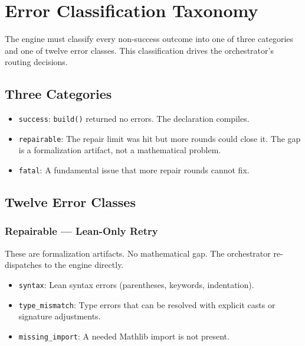 \documentclass[11pt,a4paper]{article}
\begin{document}
\section{Error Classification Taxonomy}
\label{sec:errors}

The engine must classify every non-success outcome into one of three categories and one of twelve error classes. This classification drives the orchestrator's routing decisions.

\subsection{Three Categories}

\begin{itemize}[leftmargin=2em]
  \item \texttt{success}: \texttt{build()} returned no errors. The declaration compiles.
  \item \texttt{repairable}: The repair limit was hit but more rounds could close it. The gap is a formalization artifact, not a mathematical problem.
  \item \texttt{fatal}: A fundamental issue that more repair rounds cannot fix.
\end{itemize}

\subsection{Twelve Error Classes}

\subsubsection{Repairable --- Lean-Only Retry}

These are formalization artifacts. No mathematical gap. The orchestrator re-dispatches to the engine directly.

\begin{itemize}[leftmargin=2em]
  \item \texttt{syntax}: Lean syntax errors (parentheses, keywords, indentation).
  \item \texttt{type\_mismatch}: Type errors that can be resolved with explicit casts or signature adjustments.
  \item \texttt{missing\_import}: A needed Mathlib import is not present.
\end{itemize}
\end{document}
